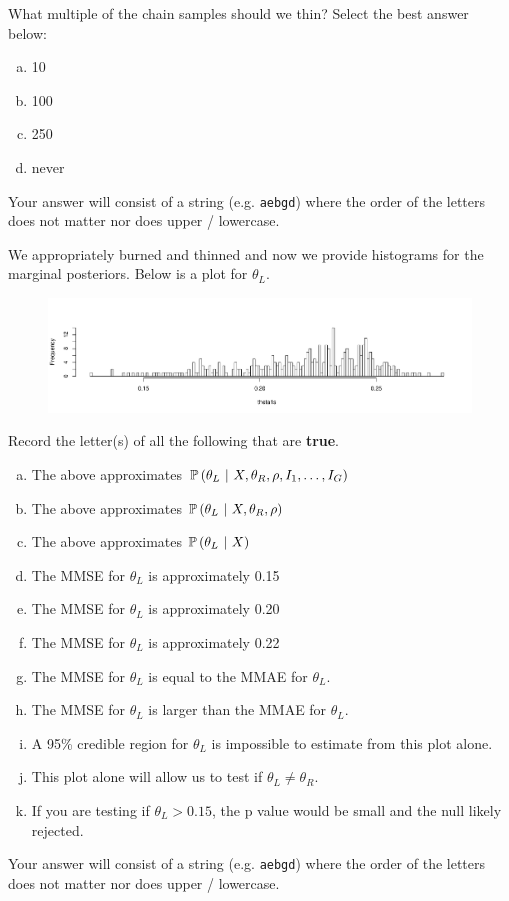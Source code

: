 \documentclass[12pt]{article}
\newcommand{\instr}{\scriptsize Your answer will consist of a string (e.g. \texttt{aebgd}) where the order of the letters does not matter nor does upper / lowercase. \normalsize}
\newcommand{\recordletters}{\small Record the letter(s) of all the following that are \textbf{true}. \normalsize}
\begin{document}
\benum{} What multiple of the chain samples should we thin? Select the best answer below:

\begin{enumerate}[(a)]
\item 10
\item 100
\item 250
\item never
\end{enumerate}\eenum\instr\pagebreak


\problem [6min]  We appropriately burned and thinned and now we provide histograms for the marginal posteriors.  Below is a plot for $\theta_L$.

\begin{figure}[h]
\centering
\includegraphics[width=7in]{theta1s}
\end{figure}

\vspace{-1cm}
\benum{} \recordletters

\begin{enumerate}[(a)]
\item The above approximates $\mathbb{P}\left(\theta_L~|~X, \theta_R, \rho, I_1, \ldots, I_G\right)$ 
\item The above approximates $\mathbb{P}\left(\theta_L~|~X, \theta_R, \rho\right)$ 
\item The above approximates $\mathbb{P}\left(\theta_L~|~X\right)$ 
\item The MMSE for $\theta_L$ is approximately 0.15
\item The MMSE for $\theta_L$ is approximately 0.20
\item The MMSE for $\theta_L$ is approximately 0.22
\item The MMSE for $\theta_L$ is equal to the MMAE for $\theta_L$.
\item The MMSE for $\theta_L$ is larger than the MMAE for $\theta_L$.
\item A 95\% credible region for $\theta_L$ is impossible to estimate from this plot alone.
\item This plot alone will allow us to test if $\theta_L \neq \theta_R$.
\item If you are testing if $\theta_L > 0.15$, the p value would be small and the null likely rejected.
\end{enumerate}\eenum\instr\pagebreak
\end{document}

